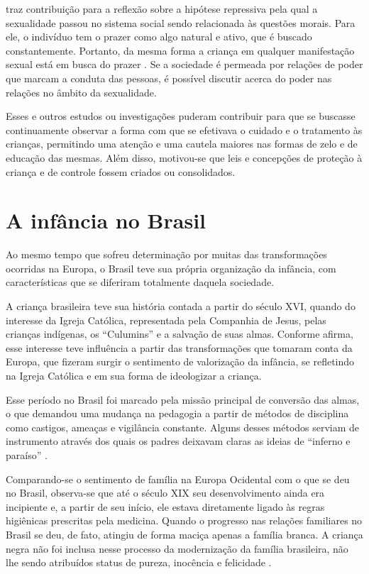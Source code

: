  traz contribuição para a reflexão sobre a hipótese repressiva pela qual a sexualidade passou no sistema social sendo relacionada às questões morais. Para ele, o indivíduo tem o prazer como algo natural e ativo, que é buscado constantemente. Portanto, da mesma forma a criança em qualquer manifestação sexual está em busca do prazer \cite{DONIZETE2010}. Se a sociedade é permeada por relações de poder que marcam a conduta das pessoas, é possível discutir acerca do poder nas relações no âmbito da sexualidade.

Esses e outros estudos ou investigações puderam contribuir para que se buscasse continuamente observar a forma com que se efetivava o cuidado e o tratamento às crianças, permitindo uma atenção e uma cautela maiores nas formas de zelo e de educação das mesmas. Além disso, motivou-se que leis e concepções de proteção à criança e de controle fossem criados ou consolidados.

\section{A infância no Brasil}

Ao mesmo tempo que sofreu determinação por muitas das transformações ocorridas na Europa, o Brasil teve sua própria organização da infância, com características que se diferiram totalmente daquela sociedade.

A criança brasileira teve sua história contada a partir do século XVI, quando do interesse da Igreja Católica, representada pela Companhia de Jesus, pelas crianças indígenas, os ``Culumins'' e a salvação de suas almas. Conforme  afirma, esse interesse teve influência a partir das transformações que tomaram conta da Europa, que fizeram surgir o sentimento de valorização da infância, se refletindo na Igreja Católica e em sua forma de ideologizar a criança.

Esse período no Brasil foi marcado pela missão principal de conversão das almas, o que demandou uma mudança na pedagogia a partir de métodos de disciplina como castigos, ameaças e vigilância constante. Alguns desses métodos serviam de instrumento através dos quais os padres deixavam claras as ideias de ``inferno e paraíso'' \cite[p. 37]{SANTOS1994}.

Comparando-se o sentimento de família na Europa Ocidental com o que se deu no Brasil, observa-se que até o século XIX seu desenvolvimento ainda era incipiente e, a partir de seu início, ele estava diretamente ligado às regras higiênicas prescritas pela medicina. Quando o progresso nas relações familiares no Brasil se deu, de fato, atingiu de forma maciça apenas a família branca. A criança negra não foi inclusa nesse processo da modernização da família brasileira, não lhe sendo atribuídos status de pureza, inocência e felicidade \cite{SANTOS1994}. 

